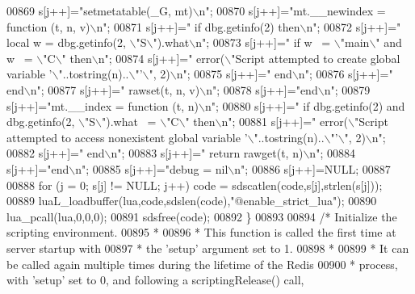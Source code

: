 \begin{DoxyCode}
{{{{{{{{00869     s[j++]=\textcolor{stringliteral}{"setmetatable(\_G, mt)\(\backslash\)n"};
00870     s[j++]=\textcolor{stringliteral}{"mt.\_\_newindex = function (t, n, v)\(\backslash\)n"};
00871     s[j++]=\textcolor{stringliteral}{"  if dbg.getinfo(2) then\(\backslash\)n"};
00872     s[j++]=\textcolor{stringliteral}{"    local w = dbg.getinfo(2, \(\backslash\)"S\(\backslash\)").what\(\backslash\)n"};
00873     s[j++]=\textcolor{stringliteral}{"    if w ~= \(\backslash\)"main\(\backslash\)" and w ~= \(\backslash\)"C\(\backslash\)" then\(\backslash\)n"};
00874     s[j++]=\textcolor{stringliteral}{"      error(\(\backslash\)"Script attempted to create global variable '\(\backslash\)"..tostring(n)..\(\backslash\)"'\(\backslash\)", 2)\(\backslash\)n"};
00875     s[j++]=\textcolor{stringliteral}{"    end\(\backslash\)n"};
00876     s[j++]=\textcolor{stringliteral}{"  end\(\backslash\)n"};
00877     s[j++]=\textcolor{stringliteral}{"  rawset(t, n, v)\(\backslash\)n"};
00878     s[j++]=\textcolor{stringliteral}{"end\(\backslash\)n"};
00879     s[j++]=\textcolor{stringliteral}{"mt.\_\_index = function (t, n)\(\backslash\)n"};
00880     s[j++]=\textcolor{stringliteral}{"  if dbg.getinfo(2) and dbg.getinfo(2, \(\backslash\)"S\(\backslash\)").what ~= \(\backslash\)"C\(\backslash\)" then\(\backslash\)n"};
00881     s[j++]=\textcolor{stringliteral}{"    error(\(\backslash\)"Script attempted to access nonexistent global variable
       '\(\backslash\)"..tostring(n)..\(\backslash\)"'\(\backslash\)", 2)\(\backslash\)n"};
00882     s[j++]=\textcolor{stringliteral}{"  end\(\backslash\)n"};
00883     s[j++]=\textcolor{stringliteral}{"  return rawget(t, n)\(\backslash\)n"};
00884     s[j++]=\textcolor{stringliteral}{"end\(\backslash\)n"};
00885     s[j++]=\textcolor{stringliteral}{"debug = nil\(\backslash\)n"};
00886     s[j++]=NULL;
00887 
00888     \textcolor{keywordflow}{for} (j = 0; s[j] != NULL; j++) code = sdscatlen(code,s[j],strlen(s[j]));
00889     luaL\_loadbuffer(lua,code,sdslen(code),\textcolor{stringliteral}{"@enable\_strict\_lua"});
00890     lua\_pcall(lua,0,0,0);
00891     sdsfree(code);
00892 \}
00893 
00894 \textcolor{comment}{/* Initialize the scripting environment.}
00895 \textcolor{comment}{ *}
00896 \textcolor{comment}{ * This function is called the first time at server startup with}
00897 \textcolor{comment}{ * the 'setup' argument set to 1.}
00898 \textcolor{comment}{ *}
00899 \textcolor{comment}{ * It can be called again multiple times during the lifetime of the Redis}
00900 \textcolor{comment}{ * process, with 'setup' set to 0, and following a scriptingRelease() call,}
}}}}}}}}
\end{DoxyCode}

